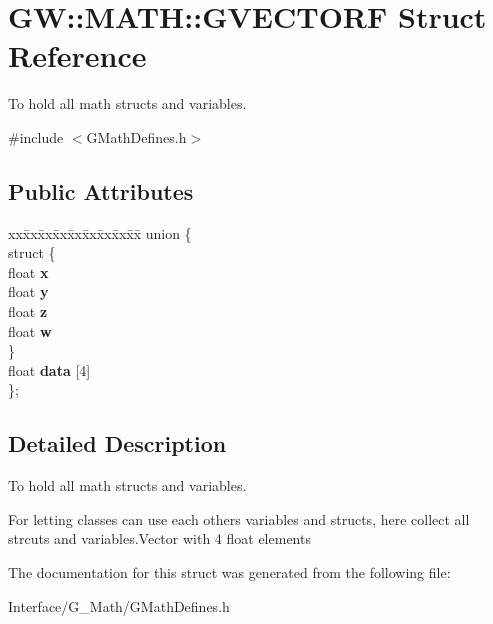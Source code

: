 \hypertarget{structGW_1_1MATH_1_1GVECTORF}{}\section{GW\+::M\+A\+TH\+::G\+V\+E\+C\+T\+O\+RF Struct Reference}
\label{structGW_1_1MATH_1_1GVECTORF}


To hold all math structs and variables.  




{\ttfamily \#include $<$G\+Math\+Defines.\+h$>$}

\subsection*{Public Attributes}
\begin{DoxyCompactItemize}
\item 
\mbox{\label{structGW_1_1MATH_1_1GVECTORF_a38acd9d2b655a4357b2430d20e50f31e}} 
\begin{tabbing}
xx\=xx\=xx\=xx\=xx\=xx\=xx\=xx\=xx\=\kill
union \{\\
\mbox{\label{unionGW_1_1MATH_1_1GVECTORF_1_1_0D4_a8671179b6484d5fa64dc13ba474fa3a8}} 
\>struct \{\\
\>\>float {\bfseries x}\\
\>\>float {\bfseries y}\\
\>\>float {\bfseries z}\\
\>\>float {\bfseries w}\\
\>\} \\
\>float {\bfseries data} \mbox{[}4\mbox{]}\\
\}; \\

\end{tabbing}\end{DoxyCompactItemize}


\subsection{Detailed Description}
To hold all math structs and variables. 

For letting classes can use each others variables and structs, here collect all strcuts and variables.\+Vector with 4 float elements 

The documentation for this struct was generated from the following file\+:\begin{DoxyCompactItemize}
\item 
Interface/\+G\+\_\+\+Math/G\+Math\+Defines.\+h\end{DoxyCompactItemize}
